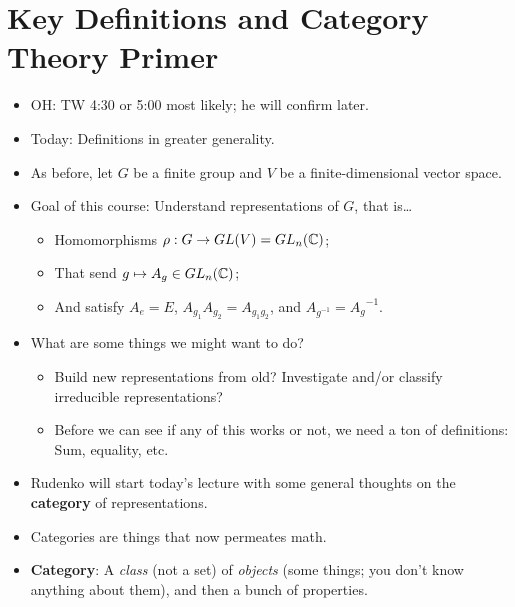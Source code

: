 \documentclass[../notes.tex]{subfiles}
\begin{document}
\section{Key Definitions and Category Theory Primer}
\begin{itemize}
    \item {}OH: TW 4:30 or 5:00 most likely; he will confirm later.
    \item Today: Definitions in greater generality.
    \item As before, let $G$ be a finite group and $V$ be a finite-dimensional vector space.
    \item Goal of this course: Understand representations of $G$, that is\dots
    \begin{itemize}
        \item Homomorphisms $\rho:G\to GL(V)=GL_n(\mathbb{C})$;
        \item That send $g\mapsto A_g\in GL_n(\mathbb{C})$;
        \item And satisfy $A_e=E$, $A_{g_1}A_{g_2}=A_{g_1g_2}$, and $A_{g^{-1}}={A_g}^{-1}$.
    \end{itemize}
    \item What are some things we might want to do?
    \begin{itemize}
        \item Build new representations from old? Investigate and/or classify irreducible representations?
        \item Before we can see if any of this works or not, we need a ton of definitions: Sum, equality, etc.
    \end{itemize}
    \item Rudenko will start today's lecture with some general thoughts on the \textbf{category} of representations.
    \item Categories are things that now permeates math.
    \item \textbf{Category}: A \emph{class} (not a set) of \emph{objects} (some things; you don't know anything about them), and then a bunch of properties.
    \begin{figure}[h!]
        \centering
\end{figure}
\end{itemize}
\end{document}
